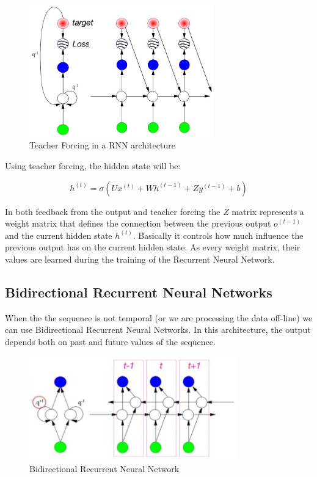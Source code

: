 \begin{figure}[h]
    \centering
    \includegraphics[width=8cm]{Images/teacher-forcing.jpg}
    \caption{Teacher Forcing in a RNN architecture}
    \label{fig:teacher-forcing}
\end{figure}

\noindent Using teacher forcing, the hidden state will be:

$$ h^{(t)} = \sigma \left( U x^{(t)} + W h^{(t-1)} + Z y^{(t - 1)} + b \right) $$

\newpage
\noindent In both feedback from the output and teacher forcing the $Z$ matrix represents a weight matrix that defines the connection between the previous output $o^{(t-1)}$ and the current hidden state $h^{(t)}$. Basically it controls how much influence the previous output has on the current hidden state. As every weight matrix, their values are learned during the training of the Recurrent Neural Network.


\subsection{Bidirectional Recurrent Neural Networks}

When the the sequence is not temporal (or we are processing the data off-line) we can use Bidirectional Recurrent Neural Networks. In this architecture, the output depends both on past and future values of the sequence.

\begin{figure}[h]
    \centering
    \includegraphics[width=9cm]{Images/bidirectional.jpg}
    \caption{Bidirectional Recurrent Neural Network}
    \label{fig:bidirectional}
\end{figure}

